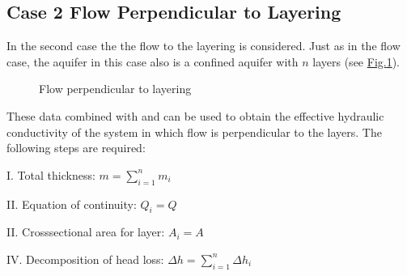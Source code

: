 \documentclass[letterpaper,10pt,english]{jupyterBook}
\begin{document}
\subsection{Case 2 \sphinxhyphen{} Flow Perpendicular to Layering}
\label{\detokenize{content/flow/L5/15_het_iso:case-2-flow-perpendicular-to-layering}}
\sphinxAtStartPar
In the second case the the flow  to the layering is considered. Just as in the  flow case, the aquifer in this case also is a confined aquifer with \(n\) layers (see \hyperref[\detokenize{content/flow/L5/15_het_iso:flow-perpendicular}]{Fig.\@ \ref{\detokenize{content/flow/L5/15_het_iso:flow-perpendicular}}}).

\begin{figure}[htbp]
\centering
\capstart

\noindent{}
\caption{Flow perpendicular to layering}\label{\detokenize{content/flow/L5/15_het_iso:flow-perpendicular}}\end{figure}

\sphinxAtStartPar
These data combined with  and  can be used to obtain the effective hydraulic conductivity of the system in which flow is perpendicular to the layers. The following steps are required:

\sphinxAtStartPar
I. Total thickness: \(m = \sum\limits_{i=1}^n m_i \)

\sphinxAtStartPar
II.   Equation of continuity: \(Q_i = Q\)

\sphinxAtStartPar
II.  Cross\sphinxhyphen{}sectional area for layer: \(A_i = A \)

\sphinxAtStartPar
IV. Decomposition of head loss: \(\Delta h = \sum\limits_{i=1}^n \Delta h_i \)
\end{document}
